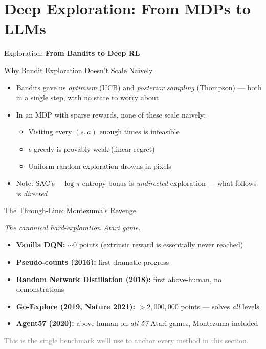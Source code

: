 \section{Deep Exploration: From MDPs to LLMs}

\begin{frame}{}
    \LARGE Exploration: \textbf{From Bandits to Deep RL}
\end{frame}

\begin{frame}{Why Bandit Exploration Doesn't Scale Naively}
\begin{itemize}
    \setlength{\itemsep}{0.55em}
    \item Bandits gave us \emph{optimism} (UCB) and \emph{posterior sampling} (Thompson) --- both in a single step, with no state to worry about
    \item In an MDP with sparse rewards, none of these scale naively:
    \begin{itemize}
        \item Visiting every $(s,a)$ enough times is infeasible
        \item $\epsilon$-greedy is provably weak (linear regret)
        \item Uniform random exploration drowns in pixels
    \end{itemize}
    \item Note: SAC's $-\log\pi$ entropy bonus is \emph{undirected} exploration --- what follows is \emph{directed}
\end{itemize}
\end{frame}

\begin{frame}{The Through-Line: Montezuma's Revenge}
\begin{center}
\textit{The canonical hard-exploration Atari game.}
\end{center}
\vspace{0.6em}
\begin{itemize}
    \setlength{\itemsep}{0.45em}
    \item \textbf{Vanilla DQN:} $\sim 0$ points (extrinsic reward is essentially never reached)
    \item \textbf{Pseudo-counts (2016):} first dramatic progress
    \item \textbf{Random Network Distillation (2018):} first above-human, no demonstrations
    \item \textbf{Go-Explore (2019, Nature 2021):} $>2{,}000{,}000$ points --- solves \emph{all} levels
    \item \textbf{Agent57 (2020):} above human on \emph{all 57} Atari games, Montezuma included
\end{itemize}
\vspace{0.5em}
\centering\small\textcolor{gray}{This is the single benchmark we'll use to anchor every method in this section.}
\end{frame}

